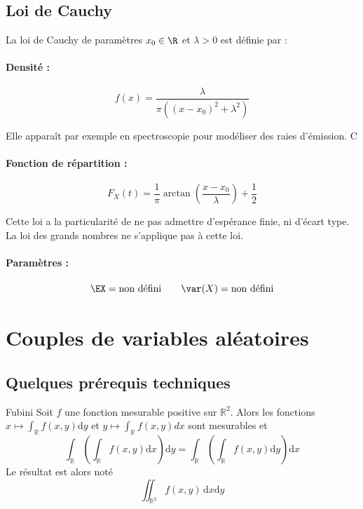 	\subsection{Loi de Cauchy}
	La loi de Cauchy de paramètres $x_0 \in \R $ et $\lambda >0$ est définie par :
	
	\paragraph{Densité :} 
	$$f(x) = \frac{\lambda}{\pi((x-x_0)^2+\lambda^2)}$$
	
	Elle apparaît par exemple en spectroscopie pour modéliser des raies d'émission. C
	
	\paragraph{Fonction de répartition :}
	
	$$F_X(t)=\frac{1}{\pi} \arctan{\left(\frac{x-x_0}{\lambda}\right)} + \frac12$$
	
	Cette loi a la particularité de ne pas admettre d'espérance finie, ni d'écart type. La loi des grands nombres ne s'applique pas à cette loi.
	
	\paragraph{Paramètres :}
	
	$$\EX = \text{non défini} \qquad \var(X)= \text{non défini}$$
	

	
\section{Couples de variables aléatoires}
	
	\subsection{Quelques prérequis techniques}
	
	\begin{theoreme}{Fubini}{}
		Soit $f$ une fonction mesurable positive sur $\mathbb{R}^2$. Alors les fonctions $x \mapsto \int_{\mathbb{R}} f(x,y)\mathrm{d}y$ et $y \mapsto \int_{\mathbb{R}} f(x,y)dx$ sont mesurables et 
		$$\int_{\mathbb{R}} \left( \int_{\mathbb{R}}  f(x,y) \mathrm{d}x  \right) \mathrm{d}y = \int_{\mathbb{R}} \left( \int_{\mathbb{R}}  f(x,y) \mathrm{d}y  \right) \mathrm{d}x$$
		Le résultat est alors noté 
		$$ \iint_{\mathbb{R}^2} f(x,y)\, \mathrm{d}x\mathrm{d}y$$ 
	\end{theoreme}
	
